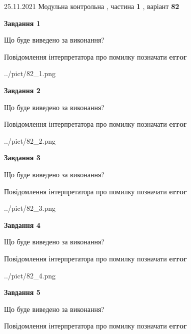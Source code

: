 \documentclass[10pt, ukrainian]{article}
\begin{document}
{25.11.2021 Модульна контрольна , частина \textbf { 1 }, варіант  \No \textbf { 82 }\par}
{
\begin {large}

{\begin {center}\textbf{Завдання 1}\end {center}}\par
Що буде виведено за виконання? \par
Повідомлення інтерпретатора про помилку позначати \textbf{error}

\begin{center}
	{../pict/82_1.png}
\end{center}
\newpage

{\begin {center}\textbf{Завдання 2}\end {center}}\par
Що буде виведено за виконання? \par
Повідомлення інтерпретатора про помилку позначати \textbf{error}

\begin{center}
	{../pict/82_2.png}
\end{center}
\newpage

{\begin {center}\textbf{Завдання 3}\end {center}}\par
Що буде виведено за виконання? \par
Повідомлення інтерпретатора про помилку позначати \textbf{error}

\begin{center}
	{../pict/82_3.png}
\end{center}
\newpage

{\begin {center}\textbf{Завдання 4}\end {center}}\par
Що буде виведено за виконання? \par
Повідомлення інтерпретатора про помилку позначати \textbf{error}

\begin{center}
	{../pict/82_4.png}
\end{center}
\newpage

{\begin {center}\textbf{Завдання 5}\end {center}}\par
Що буде виведено за виконання? \par
Повідомлення інтерпретатора про помилку позначати \textbf{error}


\end{large}}
\end{document}
